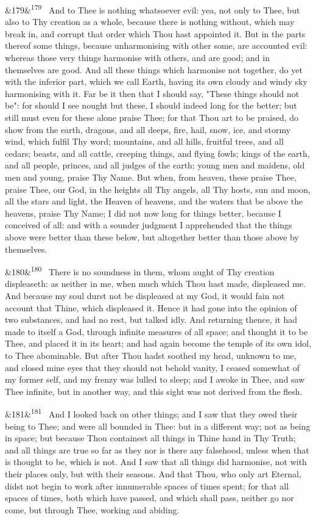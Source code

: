 \documentclass[12pt]{article}
\newcommand{\para}[1][]{\par\noindent\ifx&#1&\else\textsuperscript{\footnotesize #1}~\fi}
\begin{document}
\para[179] And to Thee is nothing whatsoever evil: yea, not only to Thee, but also to Thy creation as a whole, because there is nothing without, which may break in, and corrupt that order which Thou hast appointed it. But in the parts thereof some things, because unharmonising with other some, are accounted evil: whereas those very things harmonise with others, and are good; and in themselves are good. And all these things which harmonise not together, do yet with the inferior part, which we call Earth, having its own cloudy and windy sky harmonising with it. Far be it then that I should say, "These things should not be": for should I see nought but these, I should indeed long for the better; but still must even for these alone praise Thee; for that Thou art to be praised, do show from the earth, dragons, and all deeps, fire, hail, snow, ice, and stormy wind, which fulfil Thy word; mountains, and all hills, fruitful trees, and all cedars; beasts, and all cattle, creeping things, and flying fowls; kings of the earth, and all people, princes, and all judges of the earth; young men and maidens, old men and young, praise Thy Name. But when, from heaven, these praise Thee, praise Thee, our God, in the heights all Thy angels, all Thy hosts, sun and moon, all the stars and light, the Heaven of heavens, and the waters that be above the heavens, praise Thy Name; I did not now long for things better, because I conceived of all: and with a sounder judgment I apprehended that the things above were better than these below, but altogether better than those above by themselves.

\para[180] There is no soundness in them, whom aught of Thy creation displeaseth: as neither in me, when much which Thou hast made, displeased me. And because my soul durst not be displeased at my God, it would fain not account that Thine, which displeased it. Hence it had gone into the opinion of two substances, and had no rest, but talked idly. And returning thence, it had made to itself a God, through infinite measures of all space; and thought it to be Thee, and placed it in its heart; and had again become the temple of its own idol, to Thee abominable. But after Thou hadst soothed my head, unknown to me, and closed mine eyes that they should not behold vanity, I ceased somewhat of my former self, and my frenzy was lulled to sleep; and I awoke in Thee, and saw Thee infinite, but in another way, and this sight was not derived from the flesh.

\para[181] And I looked back on other things; and I saw that they owed their being to Thee; and were all bounded in Thee: but in a different way; not as being in space; but because Thou containest all things in Thine hand in Thy Truth; and all things are true so far as they nor is there any falsehood, unless when that is thought to be, which is not. And I saw that all things did harmonise, not with their places only, but with their seasons. And that Thou, who only art Eternal, didst not begin to work after innumerable spaces of times spent; for that all spaces of times, both which have passed, and which shall pass, neither go nor come, but through Thee, working and abiding.
\end{document}

